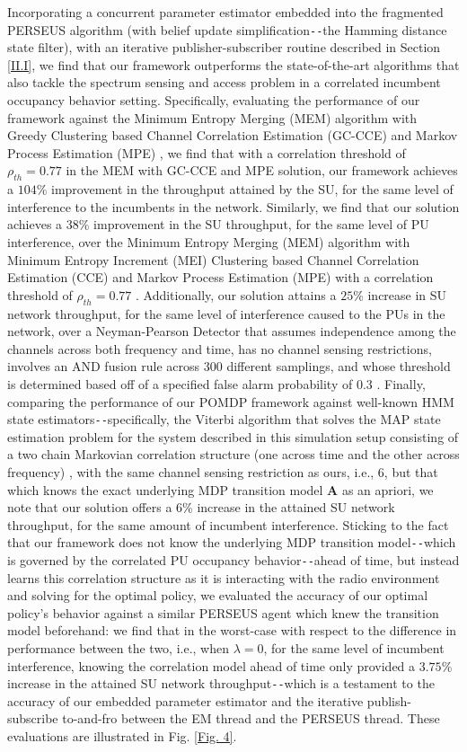 Incorporating a concurrent parameter estimator embedded into the fragmented PERSEUS algorithm (with belief update simplification\texttt{-{}-}the Hamming distance state filter), with an iterative publisher-subscriber routine described in Section \ref{II.I}, we find that our framework outperforms the state-of-the-art algorithms that also tackle the spectrum sensing and access problem in a correlated incumbent occupancy behavior setting. Specifically, evaluating the performance of our framework against the Minimum Entropy Merging (MEM) algorithm with Greedy Clustering based Channel Correlation Estimation (GC-CCE) and Markov Process Estimation (MPE) \cite{WCL:7}, we find that with a correlation threshold of $\rho_{th}{=}0.77$ in the MEM with GC-CCE and MPE solution, our framework achieves a $104$\% improvement in the throughput attained by the SU, for the same level of interference to the incumbents in the network. Similarly, we find that our solution achieves a $38$\% improvement in the SU throughput, for the same level of PU interference, over the Minimum Entropy Merging (MEM) algorithm with Minimum Entropy Increment (MEI) Clustering based Channel Correlation Estimation (CCE) and Markov Process Estimation (MPE) with a correlation threshold of $\rho_{th}{=}0.77$ \cite{WCL:7}. Additionally, our solution attains a $25$\% increase in SU network throughput, for the same level of interference caused to the PUs in the network, over a Neyman-Pearson Detector that assumes independence among the channels across both frequency and time, has no channel sensing restrictions, involves an AND fusion rule across 300 different samplings, and whose threshold is determined based off of a specified false alarm probability of $0.3$ \cite{WCL:paper, WCL:11}. Finally, comparing the performance of our POMDP framework against well-known HMM state estimators\texttt{-{}-}specifically, the Viterbi algorithm that solves the MAP state estimation problem for the system described in this simulation setup consisting of a two chain Markovian correlation structure (one across time and the other across frequency) \cite{WCL:6}, with the same channel sensing restriction as ours, i.e., $6$, but that which knows the exact underlying MDP transition model $\mathbf{A}$ as an apriori, we note that our solution offers a $6$\% increase in the attained SU network throughput, for the same amount of incumbent interference. Sticking to the fact that our framework does not know the underlying MDP transition model\texttt{-{}-}which is governed by the correlated PU occupancy behavior\texttt{-{}-}ahead of time, but instead learns this correlation structure as it is interacting with the radio environment and solving for the optimal policy, we evaluated the accuracy of our optimal policy's behavior against a similar PERSEUS agent which knew the transition model beforehand: we find that in the worst-case with respect to the difference in performance between the two, i.e., when $\lambda{=}0$, for the same level of incumbent interference, knowing the correlation model ahead of time only provided a $3.75$\% increase in the attained SU network throughput\texttt{-{}-}which is a testament to the accuracy of our embedded parameter estimator and the iterative publish-subscribe to-and-fro between the EM thread and the PERSEUS thread. These evaluations are illustrated in Fig. \ref{Fig. 4}.

